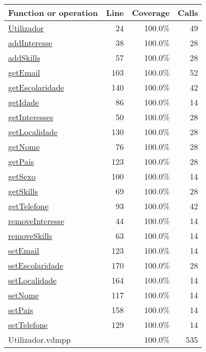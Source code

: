 \bigskip
\begin{longtable}{|l|r|r|r|}
\hline
Function or operation & Line & Coverage & Calls \\
\hline
\hline
\hyperref[Utilizador:24]{Utilizador} & 24&100.0\% & 49 \\
\hline
\hyperref[addInteresse:38]{addInteresse} & 38&100.0\% & 28 \\
\hline
\hyperref[addSkills:57]{addSkills} & 57&100.0\% & 28 \\
\hline
\hyperref[getEmail:103]{getEmail} & 103&100.0\% & 52 \\
\hline
\hyperref[getEscolaridade:140]{getEscolaridade} & 140&100.0\% & 42 \\
\hline
\hyperref[getIdade:86]{getIdade} & 86&100.0\% & 14 \\
\hline
\hyperref[getInteresses:50]{getInteresses} & 50&100.0\% & 28 \\
\hline
\hyperref[getLocalidade:130]{getLocalidade} & 130&100.0\% & 28 \\
\hline
\hyperref[getNome:76]{getNome} & 76&100.0\% & 28 \\
\hline
\hyperref[getPais:123]{getPais} & 123&100.0\% & 28 \\
\hline
\hyperref[getSexo:100]{getSexo} & 100&100.0\% & 14 \\
\hline
\hyperref[getSkills:69]{getSkills} & 69&100.0\% & 28 \\
\hline
\hyperref[getTelefone:93]{getTelefone} & 93&100.0\% & 42 \\
\hline
\hyperref[removeInteresse:44]{removeInteresse} & 44&100.0\% & 14 \\
\hline
\hyperref[removeSkills:63]{removeSkills} & 63&100.0\% & 14 \\
\hline
\hyperref[setEmail:123]{setEmail} & 123&100.0\% & 14 \\
\hline
\hyperref[setEscolaridade:170]{setEscolaridade} & 170&100.0\% & 28 \\
\hline
\hyperref[setLocalidade:164]{setLocalidade} & 164&100.0\% & 14 \\
\hline
\hyperref[setNome:117]{setNome} & 117&100.0\% & 14 \\
\hline
\hyperref[setPais:158]{setPais} & 158&100.0\% & 14 \\
\hline
\hyperref[setTelefone:129]{setTelefone} & 129&100.0\% & 14 \\
\hline
\hline
Utilizador.vdmpp & & 100.0\% & 535 \\
\hline
\end{longtable}

